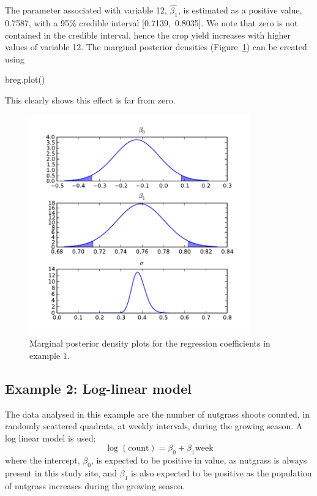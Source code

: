 \documentclass[article]{jss}
\begin{document}
The parameter associated with variable 12, $\hat{\beta_{1}}$, is
estimated as a positive value, 0.7587, with a 95\% credible interval
{[}0.7139,~0.8035{]}. We note that zero is not contained in the
credible interval, hence the crop yield increases with higher values
of variable 12. The marginal posterior densities
(Figure~\ref{Flo:mpdreg}) can be created using
\begin{Code}
breg.plot()
\end{Code}

This clearly shows this effect is far from zero. %

\begin{figure}[t!]
  \begin{center}
    \includegraphics[width=9.5cm]{mpdreg.pdf}
  \end{center}
\caption{Marginal posterior density plots for the regression coefficients in example 1.}
\label{Flo:mpdreg}
\end{figure}



\subsection{Example 2: Log-linear model}
\label{sub:Example-2:-Log-linear}

The data analysed in this example are the number of nutgrass shoots
counted, in randomly scattered quadrats, at weekly intervals, during
the growing season. A log linear model is used; \begin{equation}
  \log(\mbox{count})=\beta_{0}+\beta_{1}\mbox{week}\end{equation}
where the intercept, $\beta_{0}$, is expected to be positive in value,
as nutgrass is always present in this study site, and $\beta_{1}$ is
also expected to be positive as the population of nutgrass increases
during the growing season.
\end{document}
